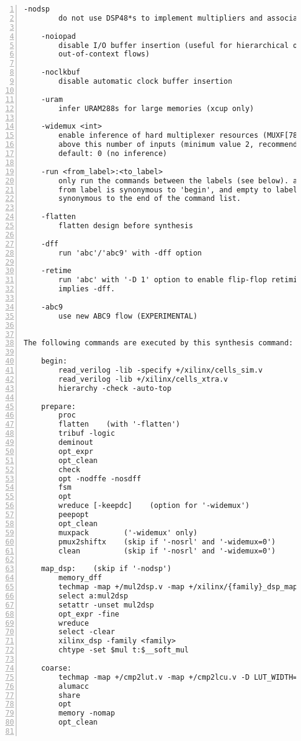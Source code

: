 \begin{lstlisting}[numbers=left,frame=single]
    -nodsp
        do not use DSP48*s to implement multipliers and associated logic

    -noiopad
        disable I/O buffer insertion (useful for hierarchical or 
        out-of-context flows)

    -noclkbuf
        disable automatic clock buffer insertion

    -uram
        infer URAM288s for large memories (xcup only)

    -widemux <int>
        enable inference of hard multiplexer resources (MUXF[78]) for muxes at or
        above this number of inputs (minimum value 2, recommended value >= 5).
        default: 0 (no inference)

    -run <from_label>:<to_label>
        only run the commands between the labels (see below). an empty
        from label is synonymous to 'begin', and empty to label is
        synonymous to the end of the command list.

    -flatten
        flatten design before synthesis

    -dff
        run 'abc'/'abc9' with -dff option

    -retime
        run 'abc' with '-D 1' option to enable flip-flop retiming.
        implies -dff.

    -abc9
        use new ABC9 flow (EXPERIMENTAL)


The following commands are executed by this synthesis command:

    begin:
        read_verilog -lib -specify +/xilinx/cells_sim.v
        read_verilog -lib +/xilinx/cells_xtra.v
        hierarchy -check -auto-top

    prepare:
        proc
        flatten    (with '-flatten')
        tribuf -logic
        deminout
        opt_expr
        opt_clean
        check
        opt -nodffe -nosdff
        fsm
        opt
        wreduce [-keepdc]    (option for '-widemux')
        peepopt
        opt_clean
        muxpack        ('-widemux' only)
        pmux2shiftx    (skip if '-nosrl' and '-widemux=0')
        clean          (skip if '-nosrl' and '-widemux=0')

    map_dsp:    (skip if '-nodsp')
        memory_dff
        techmap -map +/mul2dsp.v -map +/xilinx/{family}_dsp_map.v {options}
        select a:mul2dsp
        setattr -unset mul2dsp
        opt_expr -fine
        wreduce
        select -clear
        xilinx_dsp -family <family>
        chtype -set $mul t:$__soft_mul

    coarse:
        techmap -map +/cmp2lut.v -map +/cmp2lcu.v -D LUT_WIDTH=[46]
        alumacc
        share
        opt
        memory -nomap
        opt_clean


\end{lstlisting}
